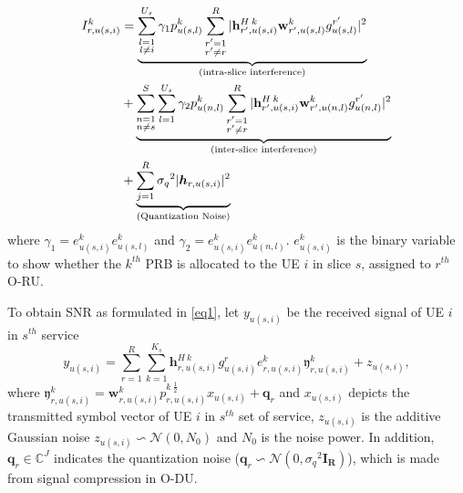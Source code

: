 \documentclass[conference]{IEEEtran}
\begin{document}
\begin{equation}\label{eqI}
\begin{split}
I_{r,u(s,i)}^{k} &=
 \underbrace{\sum_{\substack{l=1 \\ l\neq i}}^{{U}_{s}} \gamma_{1}  p_{u(s,l)}^{k}\sum_{\substack{r'=1 \\ r'\neq r}}^{R}|{\bold{h}_{r',u(s,i)}^{H \: k}} \bold{w}_{r',u(s,l)}^{k} g_{u(s,l)}^{r'}|^2}_{\text{(intra-slice interference)}}\\
&+ \underbrace{\sum_{\substack{n = 1 \\ n\neq s}}^{S}\sum_{l=1}^{{U}_s} \gamma_{2}  p_{u(n,l)}^{k}\sum_{\substack{r'=1 \\ r'\neq r}}^{R}|{\bold{h}_{r',u(s,i)}^{H \: k}} \bold{w}_{r',u(n,l)}^{k} g_{u(n,l)}^{r'}|^2}_{\text{(inter-slice interference)}}\\
&+\underbrace{  \sum_{j=1}^{{R}} {\sigma_q}^2 |\boldsymbol{h}_{r,{u(s,i)}}|^2 }_{\text{(Quantization Noise)}}
\end{split}
\end{equation}
where $\gamma_{1} = e^{k}_{u(s,i)}e^{k}_{u(s,l)}$ and $\gamma_{2} = e^{k}_{u(s,i)}e^{k}_{u(n,l)}$.
$e^{k}_{u(s,i)}$ is the binary variable to show whether the $k^{th}$ PRB is allocated to the UE $i$ in slice $s$, assigned to $r^{th}$ O-RU.

To obtain SNR as formulated in \eqref{eq1}, let $y_{u(s,i)} $ be the received signal of UE $i$ in $s^{th}$ service
\begin{equation}\label{eq2}
\textstyle y_{u(s,i)} = \sum_{r = 1}^{R}\sum_{k=1}^{K_s} \boldsymbol{h}^{H \: k}_{r,u(s,i)} g_{u(s,i)}^r e^k_{r,u(s,i)}\mathfrak{y}^k_{r,u(s,i)}+ z_{u(s,i)},
\end{equation}
where $\mathfrak{y}^k_{r,u(s,i)} =\boldsymbol{w}^k_{r,u(s,i)}{p^{k \: \frac{1}{2}}_{r,u(s,i)}} x_{u(s,i)}+ \boldsymbol{q}_{r}$
and $ x_{u(s,i)}$ depicts the transmitted symbol vector of UE $i$ in $s^{th}$ set of service,  $z_{u(s,i)}$ is the additive Gaussian noise $z_{u(s,i)} \backsim \mathcal{N}(0,N_0)$ and $N_0$ is the noise power.
In addition, $\boldsymbol{q}_{r} \in \mathbb{C}^{J }  $ indicates the quantization noise 
($\boldsymbol{q}_{r} \backsim \mathcal{N}(0,{\sigma_q}^2\boldsymbol{I_{R}} )$), which is made from signal compression in O-DU.
\end{document}
